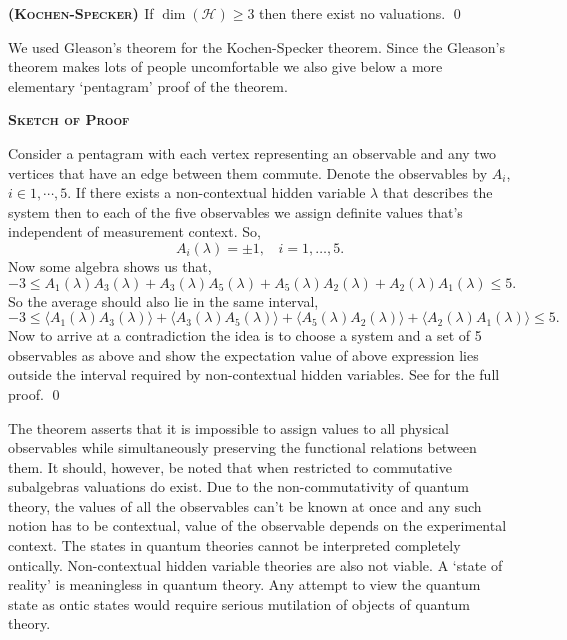 \documentclass[11pt]{report}
\begin{document}
\vspace{1em}
\begin{theorem}
	{\bfseries{\textsc{(Kochen-Specker) }}} If $\dim (\mathcal{H}) \geq 3$ then there exist no valuations. \qed
\end{theorem}
\vspace{1em}

We used Gleason's theorem for the Kochen-Specker theorem. Since the Gleason's theorem makes lots of people uncomfortable we also give below a more elementary `pentagram' proof of the theorem. 
\begin{center}
	{\bfseries\textsc{Sketch of Proof}}
\end{center}
\begin{adjustwidth}{1em}{1em}
	Consider a pentagram with each vertex representing an observable and any two vertices that have an edge between them commute. Denote the observables by $A_i$, $i\in 1,\cdots, 5$. If there exists a non-contextual hidden variable $\lambda$ that describes the system then to each of the five observables we assign definite values that's independent of measurement context. So, 
	$$A_i(\lambda)=\pm 1,\:\:\:\:i=1,\dots, 5.$$ 
	Now some algebra shows us that,
	$$-3\leq A_1(\lambda)A_3(\lambda)+A_3(\lambda)A_5(\lambda)+A_5(\lambda)A_2(\lambda)+A_2(\lambda)A_1(\lambda)\leq 5.$$
	So the average should also lie in the same interval,
	$-3\leq \langle A_1(\lambda)A_3(\lambda)\rangle+\langle A_3(\lambda)A_5(\lambda)\rangle+\langle A_5(\lambda)A_2(\lambda)\rangle+\langle A_2(\lambda)A_1(\lambda) \rangle\leq 5.$ Now to arrive at a contradiction the idea is to choose a system and a set of 5 observables as above and show the expectation value of above expression lies outside the interval required by non-contextual hidden variables. See \cite{BubStairs} for the full proof. \qed
\end{adjustwidth}
\vspace{1em}
\noindent The theorem asserts that it is impossible to assign values to all physical observables while simultaneously preserving the functional relations between them. It should, however, be noted that when restricted to commutative subalgebras valuations do exist. Due to the non-commutativity of quantum theory, the values of all the observables can't be known at once and any such notion has to be contextual, value of the observable depends on the experimental context. The states in quantum theories cannot be interpreted completely ontically. Non-contextual hidden variable theories are also not viable. A `state of reality' is meaningless in quantum theory. Any attempt to view the quantum state as ontic states would require serious mutilation of objects of quantum theory.
\end{document}
